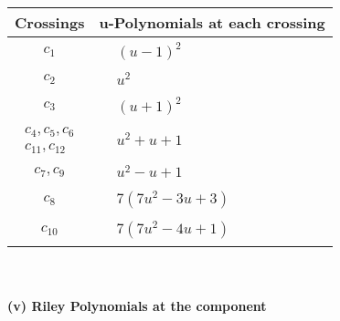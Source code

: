 \documentclass[1p]{elsarticle_modified}
\theoremstyle{definition}
\begin{document}
\begin{tabular}{m{50pt}|m{274pt}}
Crossings & \hspace{64pt}u-Polynomials at each crossing \\
\hline $$\begin{aligned}c_{1}\end{aligned}$$&$\begin{aligned}
&(u-1)^2
\end{aligned}$\\
\hline $$\begin{aligned}c_{2}\end{aligned}$$&$\begin{aligned}
&u^2
\end{aligned}$\\
\hline $$\begin{aligned}c_{3}\end{aligned}$$&$\begin{aligned}
&(u+1)^2
\end{aligned}$\\
\hline $$\begin{aligned}c_{4},c_{5},c_{6}\\c_{11},c_{12}\end{aligned}$$&$\begin{aligned}
&u^2+u+1
\end{aligned}$\\
\hline $$\begin{aligned}c_{7},c_{9}\end{aligned}$$&$\begin{aligned}
&u^2- u+1
\end{aligned}$\\
\hline $$\begin{aligned}c_{8}\end{aligned}$$&$\begin{aligned}
&7(7 u^2-3 u+3)
\end{aligned}$\\
\hline $$\begin{aligned}c_{10}\end{aligned}$$&$\begin{aligned}
&7(7 u^2-4 u+1)
\end{aligned}$\\
\hline
\end{tabular}\\~\\
\newpage\renewcommand{\arraystretch}{1}
\flushleft \textbf{(v) Riley Polynomials at the component}\newline \\
\end{document}
